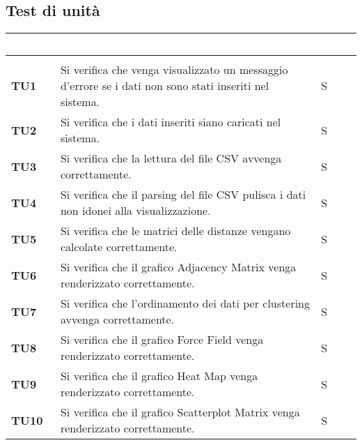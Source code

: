 \subsection{Test di unità}

{

\renewcommand{\arraystretch}{1.5}
\renewcommand\extrarowheight{1.5pt}
\setlength\arrayrulewidth{1pt}
\begin{longtable}{ C{1.5cm} | C{12cm}| C{1.5cm} } 
		\textcolor{white}{\textbf{Codice}} & 
		\textcolor{white}{\textbf{Descrizione}} & 
		\textcolor{white}{\textbf{Stato}} \\
		\endfirsthead
		\\
	    \endfoot
	    \endlastfoot

\textbf{TU1} & 
Si verifica che venga visualizzato un messaggio d'errore se
    i dati non sono stati inseriti nel sistema. & 
S\\

\textbf{TU2} & 
Si verifica che i dati inseriti siano caricati nel sistema. & 
S\\

\textbf{TU3} & 
Si verifica che la lettura del file CSV avvenga correttamente. & 
S\\

\textbf{TU4} & 
Si verifica che il parsing del file CSV pulisca i dati non idonei alla visualizzazione. & 
S\\

\textbf{TU5} & 
Si verifica che le matrici delle distanze vengano calcolate correttamente. & 
S\\

\textbf{TU6} & 
Si verifica che il grafico Adjacency Matrix venga renderizzato correttamente. & 
S\\

\textbf{TU7} & 
Si verifica che l'ordinamento dei dati per clustering avvenga correttamente. & 
S\\

\textbf{TU8} & 
Si verifica che il grafico Force Field venga renderizzato correttamente. & 
S\\

\textbf{TU9} & 
Si verifica che il grafico Heat Map venga renderizzato correttamente. & 
S\\

\textbf{TU10} & 
Si verifica che il grafico Scatterplot Matrix venga renderizzato correttamente. & 
S\\


\end{longtable}}
